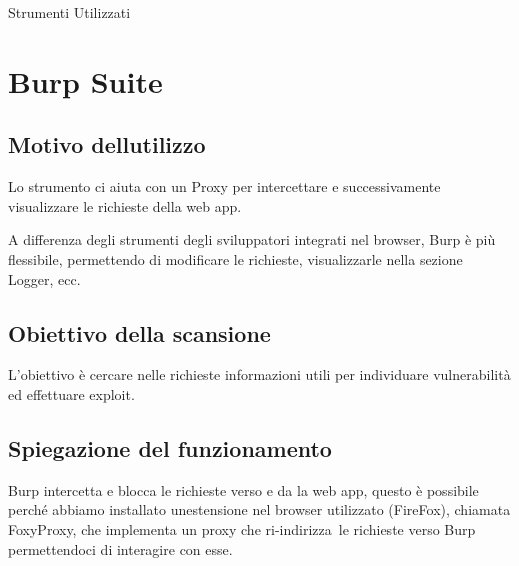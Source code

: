 \documentclass[
]{article}
\begin{document}
{}

{}

{Strumenti Utilizzati}

\section{\texorpdfstring{{Burp
Suite}}{Burp Suite}}\label{h.q6le1yyv8bb0}

\subsection{\texorpdfstring{{Motivo
dell\textquotesingle utilizzo}}{Motivo dell\textquotesingle utilizzo}}\label{h.36laddkt8sd1}

{Lo strumento ci aiuta con un Proxy per intercettare e successivamente
visualizzare le richieste della web app.}

{}

{A differenza degli strumenti degli sviluppatori integrati nel browser,
Burp è più flessibile, permettendo di modificare le richieste,
visualizzarle nella sezione Logger, ecc.}

\subsection{\texorpdfstring{{Obiettivo della
scansione}}{Obiettivo della scansione}}\label{h.pw1vi5mko92c}

{L'obiettivo è cercare nelle richieste informazioni utili per
individuare vulnerabilità ed effettuare exploit. }

\subsection{\texorpdfstring{{Spiegazione del
funzionamento}}{Spiegazione del funzionamento}}\label{h.pr2ckmjmbrp8}

{Burp intercetta e blocca le richieste verso e da la web app, questo è
possibile perché abbiamo installato un\textquotesingle estensione nel
browser utilizzato (FireFox), chiamata FoxyProxy, che implementa un
proxy che }{ri-indirizza}{~le richieste verso Burp permettendoci di
interagire con esse.}
\end{document}
